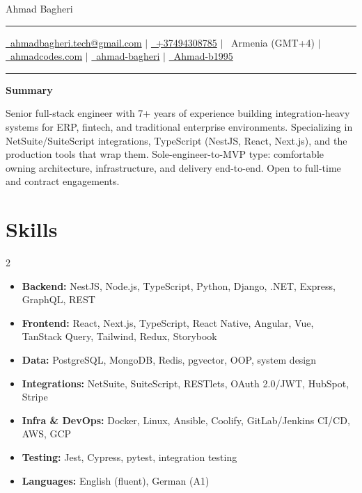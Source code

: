 \documentclass[letterpaper,10pt]{article}
\newcommand{\documentTitle}[2]{
  \begin{center}
    {\Huge\color{accentTitle} #1}
    \vspace{7pt}
    {\color{accentLine} \hrule}
    \vspace{2pt}
    \footnotesize{#2}
    \vspace{2pt}
    {\color{accentLine} \hrule}
  \end{center}
}
\newcommand{\tinysection}[1]{
  \phantomsection
  \addcontentsline{toc}{section}{#1}
  {\large{\bfseries\color{accentText}#1} {\color{accentLine} \textbar}}
}
\begin{document}
  \documentTitle{ Ahmad Bagheri }{
    \href{mailto:ahmadbagheri.tech@gmail.com}{\raisebox{-0.15\height}{\faEnvelope}~ahmadbagheri.tech@gmail.com} \quad$|$\quad
    \href{tel:+37494308785}{\raisebox{-0.15\height}{\faPhone}~+37494308785} \quad$|$\quad
    \raisebox{-0.05\height}{\faMapMarker}~Armenia (GMT+4) \quad$|$\quad
    \href{https://ahmadcodes.com}{\raisebox{-0.15\height}{\faGlobe}~ahmadcodes.com} \quad$|$\quad
    \href{https://www.linkedin.com/in/ahmad-bagheri/}{\raisebox{-0.15\height}{\faLinkedin}~ahmad-bagheri} \quad$|$\quad
    \href{https://github.com/Ahmad-b1995}{\raisebox{-0.15\height}{\faGithub}~Ahmad-b1995}
  }

  \tinysection{Summary}
  Senior full-stack engineer with 7+ years of experience building integration-heavy systems for ERP, fintech, and traditional enterprise environments. Specializing in NetSuite/SuiteScript integrations, TypeScript (NestJS, React, Next.js), and the production tools that wrap them. Sole-engineer-to-MVP type: comfortable owning architecture, infrastructure, and delivery end-to-end. Open to full-time and contract engagements.

  \section{Skills}
  \begin{multicols}{2}
    \begin{itemize}[itemsep=-2px, parsep=1pt, leftmargin=10pt, label={}]
      \item \textbf{Backend:} NestJS, Node.js, TypeScript, Python, Django, .NET, Express, GraphQL, REST
      \item \textbf{Frontend:} React, Next.js, TypeScript, React Native, Angular, Vue, TanStack Query, Tailwind, Redux, Storybook
      \item \textbf{Data:} PostgreSQL, MongoDB, Redis, pgvector, OOP, system design
      \item \textbf{Integrations:} NetSuite, SuiteScript, RESTlets, OAuth 2.0/JWT, HubSpot, Stripe
      \item \textbf{Infra \& DevOps:} Docker, Linux, Ansible, Coolify, GitLab/Jenkins CI/CD, AWS, GCP
      \item \textbf{Testing:} Jest, Cypress, pytest, integration testing
      \item \textbf{Languages:} English (fluent), German (A1)
    \end{itemize}
  \end{multicols}
\end{document}
